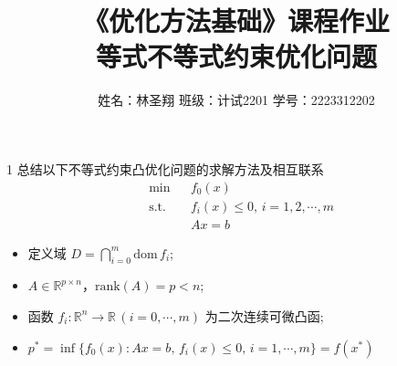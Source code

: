 \documentclass{article}
\newenvironment{problem_cn}[2][问题]{\begin{trivlist}
\item[\hskip \labelsep {\bfseries #1}\hskip \labelsep {\bfseries #2.}]}{\end{trivlist}}
\begin{document}

\title{《优化方法基础》课程作业\\等式不等式约束优化问题}  %
\author{姓名：林圣翔 \quad 班级：计试2201 \quad 学号：2223312202}  %

\maketitle

\begin{problem_cn}{1}
总结以下不等式约束凸优化问题的求解方法及相互联系
\[
\begin{aligned}
&\min && f_0(x) \\
&\text{s.t.} && f_i(x) \leq 0,\, i = 1,2,\cdots, m \\
&&& Ax = b
\end{aligned}
\]

\begin{itemize}
    \item 定义域 \( D = \bigcap_{i=0}^m \text{dom}\, f_i \);
    \item \( A \in \mathbb{R}^{p \times n} \)，\(\text{rank}(A) = p < n \);
    \item 函数 \( f_i: \mathbb{R}^n \to \mathbb{R} \, (i = 0,\cdots, m) \) 为二次连续可微凸函;
    \item \( p^* = \inf \{ f_0(x) : Ax = b,\, f_i(x) \leq 0,\, i = 1,\cdots, m \} = f(x^*) \)
\end{itemize}
\end{problem_cn}
\end{document}
